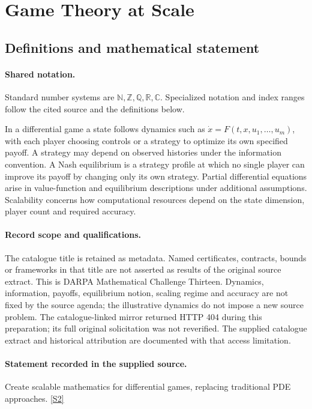 \documentclass[11pt]{article}
\newcommand{\sref}[2]{\hyperlink{source:#1:#2}{[S#2]}}
\begin{document}
\section{Game Theory at Scale}\label{statement}

\subsection{Definitions and mathematical statement}

\paragraph{Shared notation.}Standard number systems are $\mathbb N,\mathbb Z,\mathbb Q,\mathbb R,\mathbb C$. Specialized notation and index ranges follow the cited source and the definitions below.


In a differential game a state follows dynamics such as $\dot x=F(t,x,u_1,\ldots,u_m)$, with each player choosing controls or a strategy to optimize its own specified payoff. A strategy may depend on observed histories under the information convention. A Nash equilibrium is a strategy profile at which no single player can improve its payoff by changing only its own strategy. Partial differential equations arise in value-function and equilibrium descriptions under additional assumptions. Scalability concerns how computational resources depend on the state dimension, player count and required accuracy.
\paragraph{Record scope and qualifications.}
The catalogue title is retained as metadata. Named certificates, contracts, bounds or frameworks in that title are not asserted as results of the original source extract.
This is DARPA Mathematical Challenge Thirteen. Dynamics, information, payoffs, equilibrium notion, scaling regime and accuracy are not fixed by the source agenda; the illustrative dynamics do not impose a new source problem. The catalogue-linked mirror returned HTTP 404 during this preparation; its full original solicitation was not reverified. The supplied catalogue extract and historical attribution are documented with that access limitation.
\paragraph{Statement recorded in the supplied source.}
Create scalable mathematics for differential games, replacing traditional PDE approaches. \sref{statement}{2}
\end{document}
